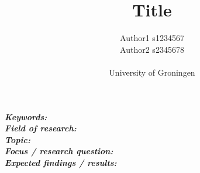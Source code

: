 \documentclass[a4paper]{article}
\title{\textbf{Title}} %
\author{Author1 %
            s1234567 %
            \\
            Author2 %
            s2345678 %
            \\\\
            University of Groningen}
\date{} %
\newcommand{\emptyline} %
    {
    \vskip 0.5cm \noindent
    }
\begin{document}
\maketitle
\begin{abstract} %
    \noindent 
    \lipsum[1] %
    \emptyline
    \lipsum[2] %
    \emptyline
    \noindent 
    \lipsum[3] %
\end{abstract} 
\emptyline
\textbf{\textit{Keywords:}} 
\\\textbf{\textit{Field of research:}}
\\\textbf{\textit{Topic:}} 
\\\textbf{\textit{Focus / research question:}} 
\\\textbf{\textit{Expected findings / results:}}




\nocite{*}


\end{document}
